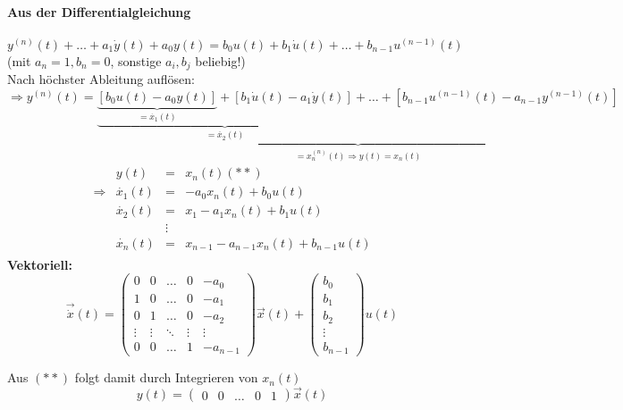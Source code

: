 \documentclass[12pt,a4paper,ngerman]{scrartcl}
\begin{document}
\paragraph{Aus der Differentialgleichung}
\begin{equation*}
y^{(n)}(t)+\dots+a_1\dot{y}(t)+a_0y(t)=b_0u(t)+b_1\dot{u}(t)+\dots+b_{n-1}u^{(n-1)}(t)  
\end{equation*}
(mit $a_n=1, b_n=0$, sonstige $a_i, b_j$ beliebig!)\\
Nach höchster Ableitung auflösen:
\begin{equation*}
  \Rightarrow y^{(n)}(t)=\underbrace{\underbrace{\underbrace{[b_0u(t)-a_0y(t)]}_{=\dot{x_1}(t)}+[b_1\dot{u}(t)-a_1\dot{y}(t)]}_{=\ddot{x_2}(t)}+\dots+[b_{n-1}u^{(n-1)}(t)-a_{n-1}y^{(n-1)}(t)]}_{=x_n^{(n)}(t)\Rightarrow y(t)=x_n(t)}
\end{equation*}
\begin{align*}
  \begin{array}{lllll}
    &y(t)&=&x_n(t)(**) \\
    \Rightarrow&\dot{x_1}(t)&=&-a_0x_n(t)+b_0u(t)\\
    &\dot{x_2}(t)&=&x_1-a_1x_n(t)+b_1u(t)\\
    &&\vdots\\
    &\dot{x_n}(t)&=&x_{n-1}-a_{n-1}x_n(t)+b_{n-1}u(t)
  \end{array}
\end{align*}
\textbf{Vektoriell:}
\begin{equation*}
  \vec{\dot{x}}(t)=
  \begin{pmatrix}
    0&0&\dots&0&-a_0\\
    1&0&\dots&0&-a_1\\
    0&1&\dots&0&-a_2\\
    \vdots&\vdots&\ddots&\vdots&\vdots\\
    0&0&\dots&1&-a_{n-1}
  \end{pmatrix}
\vec{x}(t)+
\begin{pmatrix}
  b_0\\
  b_1\\
  b_2\\
\vdots\\
  b_{n-1}
\end{pmatrix}
u(t)
\end{equation*}

Aus $(**)$ folgt damit durch Integrieren von $x_n(t)$
\begin{equation*}
  y(t)=
  \begin{pmatrix}
    0&0&\dots&0&1
  \end{pmatrix}
\vec{x}(t)
\end{equation*}
\end{document}
